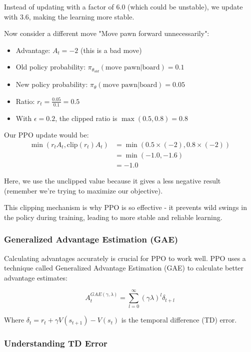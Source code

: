 \documentclass[11pt]{article}
\begin{document}
Instead of updating with a factor of $6.0$ (which could be unstable), we update with $3.6$, making the learning more stable.

Now consider a different move "Move pawn forward unnecessarily":

\begin{itemize}
    \item Advantage: $A_t = -2$ (this is a bad move)
    \item Old policy probability: $\pi_{\theta_{old}}(\text{move pawn}|\text{board}) = 0.1$
    \item New policy probability: $\pi_{\theta}(\text{move pawn}|\text{board}) = 0.05$
    \item Ratio: $r_t = \frac{0.05}{0.1} = 0.5$
    \item With $\epsilon = 0.2$, the clipped ratio is $\max(0.5, 0.8) = 0.8$
\end{itemize}

Our PPO update would be:
\begin{align*}
    \min(r_t A_t, \text{clip}(r_t) A_t) &= \min(0.5 \times (-2), 0.8 \times (-2)) \\
    &= \min(-1.0, -1.6) \\
    &= -1.0
\end{align*}

Here, we use the unclipped value because it gives a less negative result (remember we're trying to maximize our objective).

This clipping mechanism is why PPO is so effective - it prevents wild swings in the policy during training, leading to more stable and reliable learning.

\subsubsection{Generalized Advantage Estimation (GAE)}

Calculating advantages accurately is crucial for PPO to work well. PPO uses a technique called Generalized Advantage Estimation (GAE) to calculate better advantage estimates:

\begin{equation}
    A^{GAE(\gamma, \lambda)}_t = \sum_{l=0}^{\infty} (\gamma \lambda)^l \delta_{t+l}
\end{equation}

Where $\delta_t = r_t + \gamma V(s_{t+1}) - V(s_t)$ is the temporal difference (TD) error.

\subsubsection*{Understanding TD Error}
\end{document}
